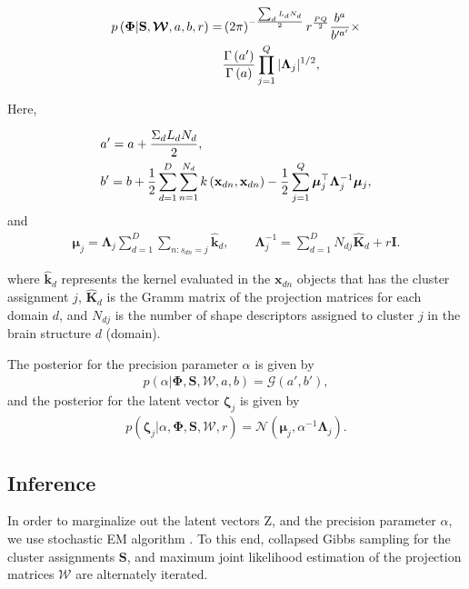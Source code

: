 \documentclass[twoside]{article}
\newcommand{\gD}[2]{\mathcal{N}\left(#1,#2\right)}
\newcommand{\kernel}[2]{k\left(#1,#2\right)}
\newcommand{\catD}[2]{\mathcal{G}\left(#1,#2\right)}
\newcommand{\Z}{\boldsymbol{\mathrm{Z}}}
\newcommand{\C}{\boldsymbol{\Lambda}_j}
\newcommand{\muJ}{\boldsymbol{\mu}_j}
\newcommand{\Scluster}{\mathbf{S}}
\newcommand{\W}{\boldsymbol{\mathcal{W}}}
\newcommand{\indobj}{\mathbf{x}_{dn}}
\newcommand{\lvec}{\boldsymbol{\zeta}_j}
\newcommand{\kawx}{\mathbf{\hat{k}}_d }
\newcommand{\Kaww}{\mathbf{\hat{K}}_d }
\begin{document}
\begin{align}
p\left(\boldsymbol{\Phi}|\Scluster,\W,a,b,r\right) =&\left(2\pi\right)^{-\frac{\sum_d L_d N_d}{2}}r^{\frac{PQ}{2}}\frac{b^{a}}{b'^{a'}}\times \notag\\
&\frac{\Gamma\left(a'\right)}{\Gamma\left(a\right)}\prod_{j=1}^{Q}|\C|^{1/2},
\label{eq:llFinalIntegrallastnm}
\end{align}

Here,

\begin{align}
&a'=a+{\frac{\Sigma_d L_d N_d}{2}}, \notag \\ &b'=b+{\frac{1}{2}}\sum\limits_{d=1}^{D}\sum\limits_{n=1}^{N_d}\kernel{\indobj}{\indobj}-{\frac{1}{2}}\sum\limits_{j=1}^{Q}\boldsymbol{\mu}_j^\top \C^{-1}\muJ,
\end{align}
 and 
\begin{align}
\muJ =\C\sum\limits_{d=1}^{D}{\sum\limits_{n:s_{dn}=j}\kawx}, \quad \quad \C^{-1} =\sum\limits_{d=1}^{D}{N_{dj}\Kaww+r\mathbf{I}}.
\end{align}

where $\kawx$  represents the kernel evaluated in the $\indobj$ objects that has the cluster assignment $j$, $\Kaww$ is the Gramm matrix of the projection matrices for each domain $d$, and $N_{dj}$ is the number of shape descriptors assigned to cluster $j$ in the brain structure $d$ (domain). 

The posterior for the precision parameter $\alpha$ is given by
\begin{align}
p\left(\alpha|\boldsymbol{\Phi},\mathbf{S},\W,a,b\right) = \catD{a'}{b'},
\end{align}
and the posterior for the latent vector $\lvec$ is given by
\begin{align}
p\left(\lvec|\alpha,\boldsymbol{\Phi},\mathbf{S},\W,r\right) = \gD{\muJ}{\alpha^{-1}\C}.
\end{align}

\subsection{Inference}

In order to marginalize out the latent vectors $\Z$, and the precision parameter $\alpha$, we use stochastic EM algorithm \cite{Iwata16}. To this end, collapsed Gibbs sampling for the cluster assignments $\Scluster$, and maximum joint likelihood estimation of the projection matrices $\W$ are alternately iterated.
\end{document}
